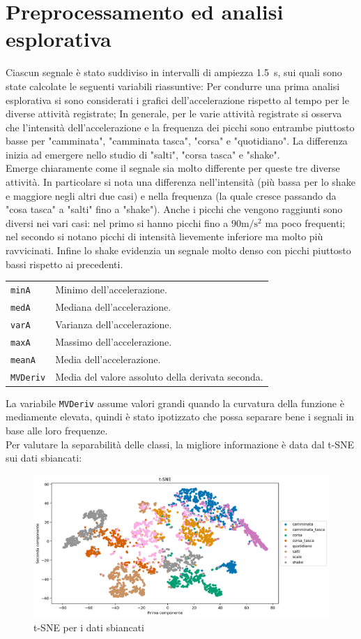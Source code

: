\documentclass[./main.tex]{subfiles}
\begin{document}
\section{Preprocessamento ed analisi esplorativa}
Ciascun segnale è stato suddiviso in intervalli di ampiezza \SI{1.5}{s}, sui quali sono state calcolate le seguenti variabili riassuntive:
 Per condurre una prima analisi esplorativa si sono considerati i grafici dell'accelerazione rispetto al tempo per le diverse attività registrate; 
In generale, per le varie attività registrate si osserva che l'intensità dell'accelerazione e la frequenza dei picchi sono entrambe piuttosto basse per "camminata", "camminata tasca", "corsa" e "quotidiano". La differenza inizia ad emergere nello studio di "salti", "corsa tasca" e "shake".\\
Emerge chiaramente come il segnale sia molto differente per queste tre diverse attività. In particolare si nota
una differenza nell'intensità (più bassa per lo shake e maggiore negli altri due casi) e nella frequenza (la quale cresce passando da "cosa tasca" a "salti" fino a "shake"). Anche i picchi che vengono raggiunti sono diversi nei vari casi: nel primo si hanno picchi fino a $90\si{\metre\per\square\second}$ ma poco frequenti; nel secondo si notano picchi di intensità lievemente inferiore ma molto più ravvicinati. Infine lo shake evidenzia un segnale molto denso con  picchi piuttosto bassi rispetto ai precedenti.\\
\begin{table}[H]
	\begin{tabular}{ll}
		\texttt{minA}& Minimo dell'accelerazione.\\
		\texttt{medA}& Mediana dell'accelerazione.\\
		\texttt{varA}& Varianza dell'accelerazione.\\
		\texttt{maxA}& Massimo dell'accelerazione.\\
		\texttt{meanA}& Media dell'accelerazione.\\
		\texttt{MVDeriv}& Media del valore assoluto della derivata seconda.
	\end{tabular}
\end{table}
La variabile \texttt{MVDeriv} assume valori grandi quando la curvatura della funzione è mediamente elevata, quindi è stato ipotizzato che possa separare bene i segnali in base alle loro frequenze.\\
Per valutare la separabilità delle classi, la migliore informazione è data dal t-SNE sui dati sbiancati:
\begin{figure}[H]
	\centering
	\includegraphics[width=.8\textwidth]{../../figure/t-SNE.png}
	\caption{{ t-SNE per i dati sbiancati}}
	\label{t-sne}
\end{figure}
\end{document}

